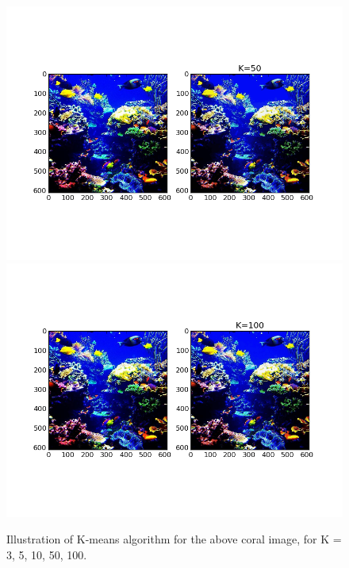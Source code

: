 \documentclass[a4paper,10pt]{article}
\begin{document}
\begin{figure}
    \includegraphics[trim = 1.5cm 3.5cm 1.5cm 3.5cm ,clip=true, width=1.0\textwidth,height=.2\textheight,keepaspectratio]{figure_2_4.png}
    \includegraphics[trim = 1.5cm 3.5cm 1.5cm 3.5cm ,clip=true, width=1.0\textwidth,height=.2\textheight,keepaspectratio]{figure_2_5.png}
  \caption{Illustration of K-means algorithm for the above coral image, for K = 3, 5, 10, 50, 100.}
  \label{fig:imagekmeans}
\end{figure}
\end{document}
